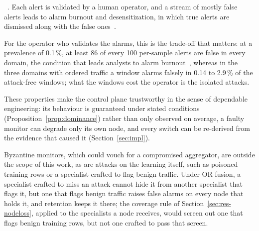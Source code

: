 ~\cite{axelsson2000baserate}. Each alert is validated by a human operator, and a stream of mostly
false alerts leads to alarm burnout and desensitization, in which true alerts are dismissed along
with the false ones~\cite{alahmadi2022soc}.

For the operator who validates the alarms, this is the trade-off that matters: at a prevalence
of 0.1\,\%, at least 86 of every 100 per-sample alerts are false in every domain, the condition
that leads analysts to alarm burnout~\cite{alahmadi2022soc}, whereas in the three domains with
ordered traffic a window alarms falsely in 0.14 to 2.9\,\% of the attack-free windows; what the
windows cost the operator is the isolated attacks.

These properties make the control plane trustworthy in the sense of dependable engineering: its
behaviour is guaranteed under stated conditions (Proposition~\ref{prop:dominance}) rather than
only observed on average, a faulty monitor can degrade only its own node, and every switch can
be re-derived from the evidence that caused it (Section~\ref{sec:impl}).

Byzantine monitors, which could vouch for a compromised aggregator, are outside the scope of
this work, as are attacks on the learning itself, such as poisoned training rows or a
specialist crafted to flag benign traffic. Under OR fusion, a specialist crafted to miss an
attack cannot hide it from another specialist that flags it, but one that flags benign traffic
raises false alarms on every node that holds it, and retention keeps it there; the coverage rule
of Section~\ref{sec:res-nodeloss}, applied to the specialists a node receives, would screen out
one that flags benign training rows, but not one crafted to pass that screen.
